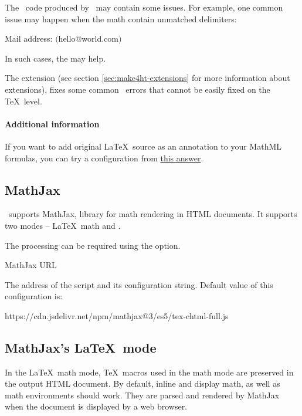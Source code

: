 The \mathml\ code produced by \texfourht\ may contain some issues. For example,
one common issue may happen when the math contain unmatched delimiters:

\begin{texsource}
 Mail address: $\lparen$hello@world.com$\rparen$
\end{texsource}

In such cases, the  may help. 

The 
extension (see section \ref{sec:make4ht-extensions} for more
information about  extensions), fixes some common \mathml\
errors that cannot be easily fixed on the \TeX\ level. 

\paragraph{Additional information}

If you want to add original \LaTeX\ source as an annotation to your MathML formulas,
you can try a configuration from \href{https://tex.stackexchange.com/a/693839/2891}{this answer}.

\subsection{MathJax}
\texfourht\ supports MathJax, library for math rendering in HTML documents. 
 It supports two modes -- \LaTeX\ math and \mathml.

The  processing can be required using the  option.

 {MathJax URL}\EndDoc

The address of the  script and its configuration string. Default value of this configuration is:

\begin{texsource}
{https://cdn.jsdelivr.net/npm/mathjax@3/es5/tex-chtml-full.js}
\end{texsource}

\subsection{MathJax's \LaTeX\ mode}

In the \LaTeX\ math mode, \TeX\ macros used in the math mode are preserved in
the output HTML document. 
By default, inline and display math, as well as math environments should work.
They are parsed and rendered by MathJax when the
document is displayed by a web browser.

